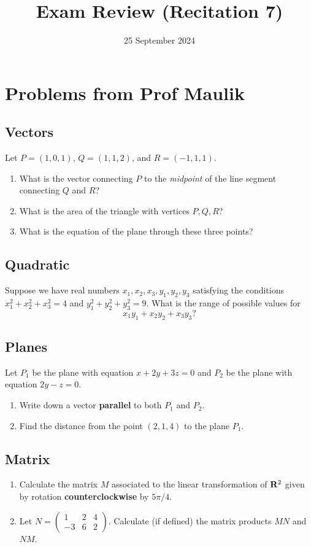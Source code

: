 \documentclass[11pt]{amsart}
\begin{document}
\title{Exam Review (Recitation 7)}
\date{25 September 2024}
\maketitle

\section{Problems from Prof Maulik}
\subsection{Vectors}
Let $P = (1,0,1)$, $Q = (1,1,2)$, and $R = (-1,1,1).$
\begin{enumerate}
\item What is the vector connecting $P$ to the \emph{midpoint} of the line segment connecting $Q$ and $R$?
\item What is the area of the triangle with vertices $P,Q,R$?
\item What is the equation of the plane through these three points?
\end{enumerate}

\subsection{Quadratic}
Suppose we have real numbers $x_1, x_2, x_3, y_1, y_2, y_3$ satisfying the conditions
$x_1^2 + x_2^2 + x_3^2 = 4$ and $y_1^2 + y_2^2 + y_3^2 = 9$.  What is the range of possible values for
$$x_1y_1 + x_2y_2+x_3y_3?$$

\subsection{Planes}
Let $P_1$ be the plane with equation $x + 2y + 3z = 0$ and $P_2$ be the plane with equation $2y - z = 0$.
\begin{enumerate}
\item Write down a vector {\bf parallel} to both $P_1$ and $P_2$.
\item Find the distance from the point $(2, 1, 4)$ to the plane $P_1$.
\end{enumerate}

\subsection{Matrix}
\begin{enumerate}
\item Calculate the matrix $M$ associated to the linear transformation of ${\bf R}^2$ given by rotation {\bf counterclockwise} by $5\pi/4$.
\item Let $N = \begin{pmatrix} 1 & 2 & 4\\ -3 & 6 & 2\end{pmatrix}.$  Calculate (if defined) the matrix products $MN$ and $NM$.
\end{enumerate}
\end{document}
